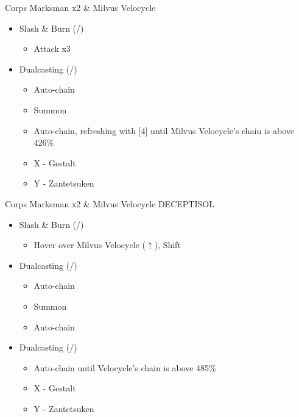 \renewcommand{\first}{[1] Slash \& Burn (\com/\rav)}
\renewcommand{\second}{[2] War \& Peace (\com/\med)}
\renewcommand{\third}{[3] Supersoldier (\com/\syn)}
\renewcommand{\fourth}{[4] Dualcasting (\rav/\rav)}
\renewcommand{\fifth}{[5] Dualcasting (\rav/\rav)}
\renewcommand{\sixth}{[6] Slash \& Burn (\com/\rav)}
\begin{battle}[0:34]{Corps Marksman x2 \& Milvus Velocycle}
		\begin{itemize}
			\item \first
			      \begin{itemize}
				      \item Attack x3
			      \end{itemize}
			\item \fifth
			      \begin{itemize}
				      \item Auto-chain
				      \item Summon
				      \item Auto-chain, refreshing with [4] until Milvus Velocycle's chain is above 426\%
				      \item X - Gestalt
				      \item Y - Zantetsuken
			      \end{itemize}
		\end{itemize}
\end{battle}
\begin{battle}[0:18]{Corps Marksman x2 \& Milvus Velocycle DECEPTISOL}
\begin{itemize}

			\item \first
			      \begin{itemize}
				      \item Hover over Milvus Velocycle ($\uparrow$), Shift
			      \end{itemize}
			\item \fifth
			      \begin{itemize}
				      \item Auto-chain
				      \item Summon
				      \item Auto-chain
			      \end{itemize}
			\item \fourth
			      \begin{itemize}
				      \item Auto-chain until Velocycle's chain is above 485\%
				      \item X - Gestalt
				      \item Y - Zantetsuken
			      \end{itemize}
			      \end{itemize}
\end{battle}
